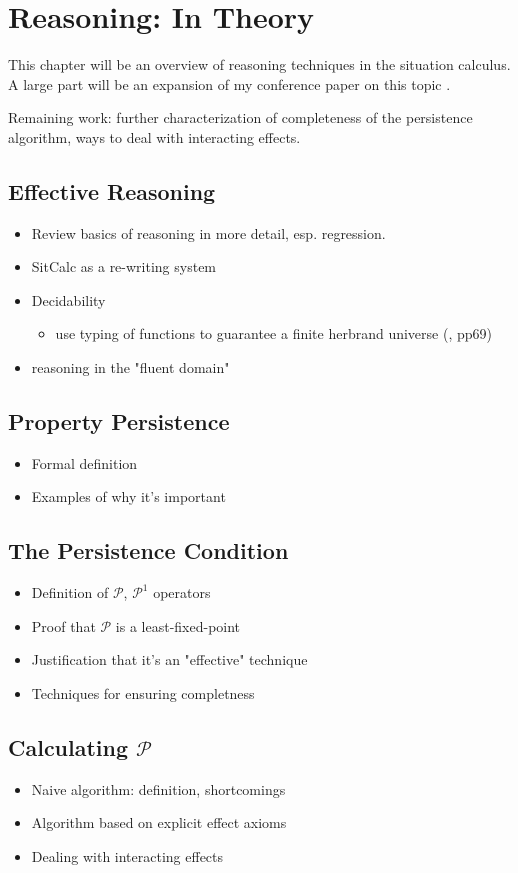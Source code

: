 \chapter{Reasoning: In Theory}\label{ch:reasoning}

This chapter will be an overview of reasoning techniques in the situation
calculus.  A large part will be an expansion of my conference paper on this topic \cite{kelly07sc_persistence}.

Remaining work: further characterization of completeness of the persistence algorithm, ways to deal with interacting effects.

\section{Effective Reasoning}

\begin{itemize}
\item Review basics of reasoning in more detail, esp. regression.
\item SitCalc as a re-writing system
\item Decidability
  \begin{itemize}
  \item use typing of functions to guarantee a finite herbrand universe (\cite{levesque04krr_book}, pp69)
  \end{itemize}
\item reasoning in the "fluent domain"
\end{itemize}

\section{Property Persistence}

\begin{itemize}
\item Formal definition
\item Examples of why it's important
\end{itemize}

\section{The Persistence Condition}

\begin{itemize}
\item Definition of $\mathcal{P}$, $\mathcal{P}^{1}$ operators
\item Proof that $\mathcal{P}$ is a least-fixed-point
\item Justification that it's an "effective" technique
\item Techniques for ensuring completness
\end{itemize}

\section{Calculating $\mathcal{P}$}

\begin{itemize}
\item Naive algorithm: definition, shortcomings
\item Algorithm based on explicit effect axioms
\item Dealing with interacting effects
\end{itemize}


